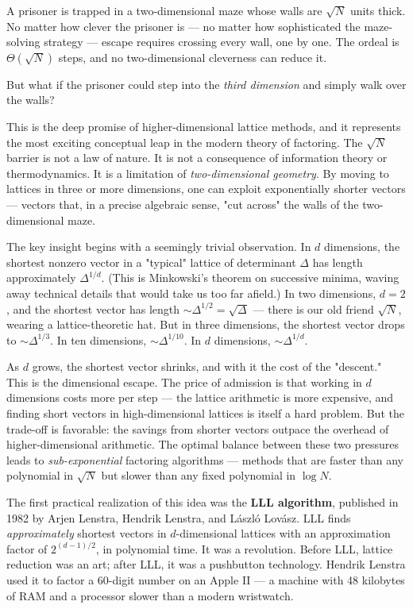 \documentclass[11pt,openright,twoside]{book}
\theoremstyle{definition}
\begin{document}
A prisoner is trapped in a two-dimensional maze whose walls are $\sqrt{N}$ units thick. No matter how clever the prisoner is --- no matter how sophisticated the maze-solving strategy --- escape requires crossing every wall, one by one. The ordeal is $\Theta(\sqrt{N})$ steps, and no two-dimensional cleverness can reduce it.

But what if the prisoner could step into the \textit{third dimension} and simply walk over the walls?

This is the deep promise of higher-dimensional lattice methods, and it represents the most exciting conceptual leap in the modern theory of factoring. The $\sqrt{N}$ barrier is not a law of nature. It is not a consequence of information theory or thermodynamics. It is a limitation of \textit{two-dimensional geometry}. By moving to lattices in three or more dimensions, one can exploit exponentially shorter vectors --- vectors that, in a precise algebraic sense, "cut across" the walls of the two-dimensional maze.

The key insight begins with a seemingly trivial observation. In $d$ dimensions, the shortest nonzero vector in a "typical" lattice of determinant $\Delta$ has length approximately $\Delta^{1/d}$. (This is Minkowski's theorem on successive minima, waving away technical details that would take us too far afield.) In two dimensions, $d = 2$, and the shortest vector has length $\sim \Delta^{1/2} = \sqrt{\Delta}$ --- there is our old friend $\sqrt{N}$, wearing a lattice-theoretic hat. But in three dimensions, the shortest vector drops to $\sim \Delta^{1/3}$. In ten dimensions, $\sim \Delta^{1/10}$. In $d$ dimensions, $\sim \Delta^{1/d}$.

As $d$ grows, the shortest vector shrinks, and with it the cost of the "descent." This is the dimensional escape. The price of admission is that working in $d$ dimensions costs more per step --- the lattice arithmetic is more expensive, and finding short vectors in high-dimensional lattices is itself a hard problem. But the trade-off is favorable: the savings from shorter vectors outpace the overhead of higher-dimensional arithmetic. The optimal balance between these two pressures leads to \textit{sub-exponential} factoring algorithms --- methods that are faster than any polynomial in $\sqrt{N}$ but slower than any fixed polynomial in $\log N$.

The first practical realization of this idea was the \textbf{LLL algorithm}, published in 1982 by Arjen Lenstra, Hendrik Lenstra, and László Lovász. LLL finds \textit{approximately} shortest vectors in $d$-dimensional lattices with an approximation factor of $2^{(d-1)/2}$, in polynomial time. It was a revolution. Before LLL, lattice reduction was an art; after LLL, it was a pushbutton technology. Hendrik Lenstra used it to factor a 60-digit number on an Apple II --- a machine with 48 kilobytes of RAM and a processor slower than a modern wristwatch.
\end{document}
